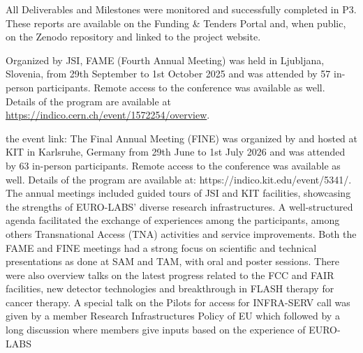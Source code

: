 All Deliverables and Milestones were monitored and successfully completed in P3. These reports are available on the Funding \& Tenders Portal and, when public, on the Zenodo repository  and linked to the project website.


Organized by JSI, FAME (Fourth Annual Meeting) was held in Ljubljana, Slovenia, from 29th September to 1st October 2025 and was attended by 57 in-person participants. Remote access to the conference was available as well. Details of the program are available at  \url{https://indico.cern.ch/event/1572254/overview}.

the event link:   The Final Annual Meeting (FINE) was organized by and hosted at KIT in Karlsruhe, Germany from 29th June to 1st July 2026 and was attended by 63 in-person participants. Remote access to the conference was available as well. Details of the program are available at: https://indico.kit.edu/event/5341/. The annual meetings included guided tours of JSI and KIT facilities, showcasing the strengths of EURO-LABS’ diverse research infrastructures. A well-structured agenda facilitated the exchange of experiences among the participants, among others Transnational Access (TNA) activities and service improvements. Both the FAME and FINE meetings had a strong focus on scientific and technical presentations as done at SAM and TAM, with oral and poster sessions. There were also overview talks on the latest progress related to the FCC and  FAIR facilities, new detector technologies and breakthrough in FLASH therapy for cancer therapy. A special talk on the Pilots for access for INFRA-SERV call was given  by a member  Research Infrastructures Policy of EU which  followed by a long discussion where members give inputs based on the experience of EURO-LABS



